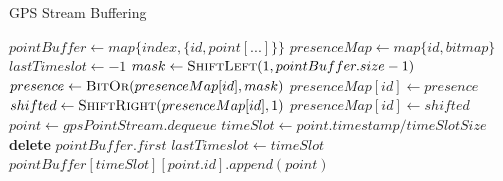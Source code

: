 \begin{algorithm}
\caption{GPS Stream Buffering}
\begin{algorithmic}[1]
    \State $pointBuffer \gets map\{index, \{id, point[...]\}\}$
    \State $presenceMap \gets map\{id, bitmap\}$
    \State $lastTimeslot \gets -1$
    \State
        \State $mask \gets \Call{ShiftLeft}{1, pointBuffer.size - 1}$
        \State $presence \gets \Call{BitOr}{presenceMap[id], mask}$
        \State $presenceMap[id] \gets presence$
    \EndProcedure
    \State
            \State $shifted \gets \Call{ShiftRight}{presenceMap[id], 1}$
            \State $presenceMap[id] \gets shifted$
        \EndFor
    \EndProcedure
    \State
        \Loop
            \State $point \gets gpsPointStream.dequeue$
            \State $timeSlot \gets point.timestamp / timeSlotSize$
                    \State {}
                    \State \textbf{delete} $pointBuffer.first$
                    \State {}
                \EndIf
                \State $lastTimeslot \gets timeSlot$
            \EndIf
            \State $pointBuffer[timeSlot][point.id].append(point)$
            \State {}
        \EndLoop
    \EndProcedure
\end{algorithmic}
\end{algorithm}


